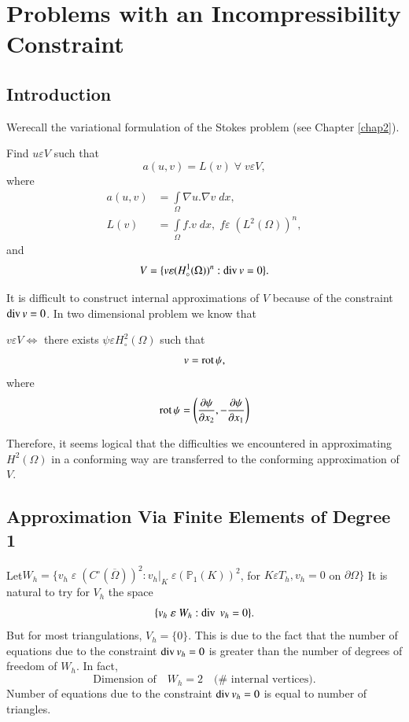 
\chapter{Problems with an Incompressibility Constraint}\label{chap6}

\section{Introduction}\label{chap6:ssec6.1} We\pageoriginale recall
the variational formulation of the Stokes problem (see Chapter
\ref{chap2}). 

Find $u\varepsilon V$ such that 
$$
a(u, v)=L(v) \; \forall\;v\varepsilon V,
$$
where
\begin{align*}
a(u, v) &= \int\limits_\Omega\nabla u.\nabla v\; dx,\\
L(v) &= \int\limits_\Omega f.v\;dx,\;f\varepsilon\;(L^2(\Omega))^n,
\end{align*}
and 
$$
V=\{v\varepsilon(H_\circ^1(\Omega))^n:\operatorname{div} v=0\}.
$$

It is difficult to construct internal approximations of $V$ because of
the constraint $\operatorname{div} v=0$. In two dimensional problem we know that 

$v\varepsilon V\Leftrightarrow$ there exists $\psi\varepsilon
H_\circ^2(\Omega)$ such that 
$$
v=\operatorname{rot} \psi,
$$
where 
$$
\operatorname{rot} \psi =\left(\frac{\partial\psi}{\partial x_2},-
\frac{\partial\psi}{\partial x_1}\right)
$$

Therefore, it seems logical that the difficulties we encountered in
approximating $H^2(\Omega)$ in a conforming way are transferred to the
conforming approximation of $V$.

\section{Approximation Via Finite Elements of Degree 1}\label{chap6:ssec6.2} Let\pageoriginale $W_h=\{v_h\;\varepsilon\;(C^\circ
(\overline{\Omega}))^2 :v_h|_K\;\varepsilon(\mathbb{P}_1(K))^2$, for
$K\varepsilon T_h, v_h=0$ on $\partial\Omega\}$ It is natural to try
for $V_h$ the space 
$$
\{v_h\;\varepsilon \;W_h: \operatorname{div}\;v_h=0\}.
$$
But for most triangulations, $V_h=\{0\}$. This is due to the fact that
the number of equations due to the constraint $\operatorname{div} v_h=0$ is greater
than the number of degrees of freedom of $W_h$. In fact,
$$
\text{Dimension of}\quad W_h=2\quad\text{($\#$ internal vertices)}.
$$
Number of equations due to the constraint $\operatorname{div} v_h=0$ is equal to
number of triangles.

